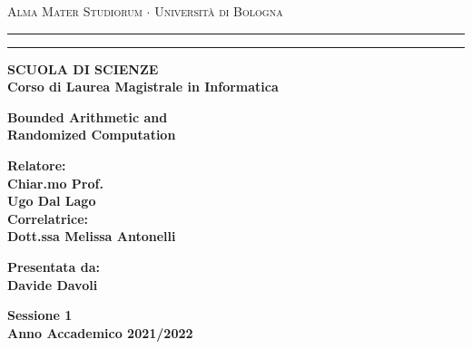 \documentclass[oneside, 10pt]{article}
\begin{document}
\begin{titlepage}
\begin{center}
{{\Large{\textsc{Alma Mater Studiorum $\cdot$ Universit\`a di
Bologna}}}} \rule[0.1cm]{15.8cm}{0.1mm}
\rule[0.5cm]{15.8cm}{0.6mm}
{\small{\bf SCUOLA DI SCIENZE\\
Corso di Laurea Magistrale in Informatica }}
\end{center}
\vspace{15mm}
\begin{center}
  {\LARGE{\bf Bounded Arithmetic and }} \\
  \vspace{3mm}
  {\LARGE{\bf Randomized Computation }
}\\
\end{center}
\vspace{95mm}
\par
\noindent
\begin{minipage}[t]{0.47\textwidth}
{\large{\bf Relatore:\\
Chiar.mo Prof.\\
Ugo Dal Lago}\\[1.5ex]
\large{\bf Correlatrice:\\
Dott.ssa Melissa Antonelli}
}
\end{minipage}
\hfill
\begin{minipage}[t]{0.47\textwidth}\raggedleft
{\large{\bf Presentata da:\\
Davide Davoli}}
\end{minipage}
\vspace{20mm}
\begin{center}
{\large{\bf Sessione 1\\%
Anno Accademico 2021/2022}}%
\end{center}
\end{titlepage}
\end{document}
